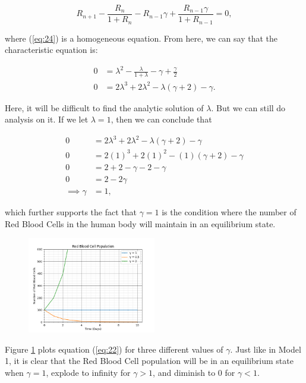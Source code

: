 \begin{equation}
    R_{n+1} - \frac{R_n}{1 + R_n} - R_{n-1}\gamma + \frac{R_{n-1}\gamma}{1+R_{n-1}} = 0,
    \label{eq:24}
\end{equation}

where (\ref{eq:24}) is a homogeneous equation. From here, we can say that the characteristic equation is:

\begin{align}
    0 &= \lambda^2 - \frac{\lambda}{1 + \lambda} - \gamma + \frac{\gamma}{2} \nonumber\\
    0 &= 2\lambda^3+2\lambda^2-\lambda(\gamma+2)-\gamma. \label{eq:25}
\end{align}

Here, it will be difficult to find the analytic solution of $\lambda$. But we can still do analysis on it. If we let $\lambda = 1$, then we can conclude that

\begin{align}
    0 &= 2\lambda^3 + 2\lambda^2 - \lambda(\gamma + 2) - \gamma \nonumber\\
    0 &= 2(1)^3 + 2(1)^2 - (1)(\gamma+2) - \gamma \nonumber\\
    0 &= 2 + 2 - \gamma - 2 - \gamma \nonumber\\
    0 &= 2 - 2\gamma \nonumber\\
    \implies \gamma &= 1, \label{eq:26}
\end{align}

which further supports the fact that $\gamma = 1$ is the condition where the number of Red Blood Cells in the human body will maintain in an equilibrium state.

\begin{figure}[H] 
    \centering
    \includegraphics[width=0.5\textwidth]{images/nonlinear_difference.png}
    \caption{}
    \label{fig:2}
\end{figure}

Figure \ref{fig:2} plots equation (\ref{eq:22}) for three different values of $\gamma$. Just like in Model 1, it is clear that the Red Blood Cell population will be in an equilibrium state when $\gamma = 1$, explode to infinity for $\gamma > 1$, and diminish to 0 for $\gamma < 1$.
